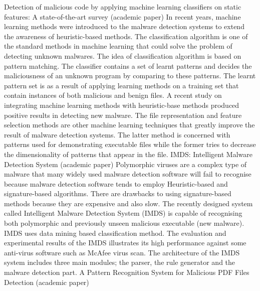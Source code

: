 Detection of malicious code by applying machine learning classifiers on static features: A state-of-the-art survey (academic paper)
In recent years, machine learning methods were introduced to the malware detection systems to extend the awareness of heuristic-based methods. The classification algorithm is one of the standard methods in machine learning that could solve the problem of detecting unknown malwares. 
The idea of classification algorithm is based on pattern matching. The classifier contains a set of learnt patterns and decides the maliciousness of an unknown program by comparing to these patterns. The learnt pattern set is as a result of applying learning methods on a training set that contain instances of both malicious and benign files. A recent study on integrating machine learning methods with heuristic-base methods produced positive results in detecting new malware.  
The file representation and feature selection methods are other machine learning techniques that greatly improve the result of malware detection systems. The latter method is concerned with patterns used for demonstrating executable files while the former tries to decrease the dimensionality of patterns that appear in the file.
IMDS: Intelligent Malware Detection System (academic paper)
Polymorphic viruses are a complex type of malware that many widely used malware detection software will fail to recognise because malware detection software tends to employ Heuristic-based and signature-based algorithms. There are drawbacks to using signature-based methods because they are expensive and also slow.  The recently designed system called Intelligent Malware Detection System (IMDS) is capable of recognising both polymorphic and previously unseen malicious executable (new malware). IMDS uses data mining based classification method. The evaluation and experimental results of the IMDS illustrates its high performance against some anti-virus software such as McAfee virus scan.
The architecture of the IMDS system includes three main modules; the parser, the rule generator and the malware detection part. 
A Pattern Recognition System for Malicious PDF Files Detection (academic paper)

